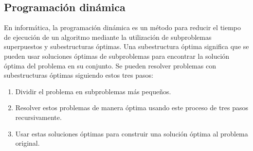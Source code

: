 \subsection{Programación dinámica}
En informática, la programación dinámica es un método para reducir el tiempo de ejecución de un algoritmo mediante la utilización de subproblemas superpuestos y subestructuras óptimas. 
Una subestructura óptima significa que se pueden usar soluciones óptimas de subproblemas para encontrar la solución óptima del problema en su conjunto.  Se pueden resolver problemas con subestructuras óptimas siguiendo estos tres pasos: 
\begin{enumerate}
	\item Dividir el problema en subproblemas más pequeños. 
	\item Resolver estos problemas de manera óptima usando este proceso de tres pasos recursivamente.
	\item Usar estas soluciones óptimas para construir una solución óptima al problema original. 
\end{enumerate}
